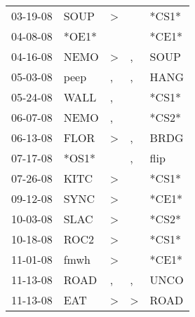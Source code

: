 \begin{supertabular}{p{0.07\textwidth}p{0.06\textwidth}p{0.02\textwidth}p{0.02\textwidth}p{0.06\textwidth}}
          03-19-08\textsuperscript{} &           SOUP\textsuperscript{} &     \textgreater &               &                            *CS1* \\
          04-08-08\textsuperscript{} &                            *OE1* &                  &               &                            *CE1* \\
          04-16-08\textsuperscript{} &           NEMO\textsuperscript{} &     \textgreater &             , &           SOUP\textsuperscript{} \\
          05-03-08\textsuperscript{} &           peep\textsuperscript{} &                , &             , &           HANG\textsuperscript{} \\
          05-24-08\textsuperscript{} &           WALL\textsuperscript{} &                , &               &                            *CS1* \\
          06-07-08\textsuperscript{} &           NEMO\textsuperscript{} &                , &               &                            *CS2* \\
          06-13-08\textsuperscript{} &           FLOR\textsuperscript{} &     \textgreater &             , &           BRDG\textsuperscript{} \\
          07-17-08\textsuperscript{} &                            *OS1* &                  &             , &           flip\textsuperscript{} \\
          07-26-08\textsuperscript{} &           KITC\textsuperscript{} &     \textgreater &               &                            *CS1* \\
          09-12-08\textsuperscript{} &           SYNC\textsuperscript{} &     \textgreater &               &                            *CE1* \\
          10-03-08\textsuperscript{} &           SLAC\textsuperscript{} &     \textgreater &               &                            *CS2* \\
          10-18-08\textsuperscript{} &           ROC2\textsuperscript{} &     \textgreater &               &                            *CS1* \\
          11-01-08\textsuperscript{} &           fmwh\textsuperscript{} &     \textgreater &               &                            *CE1* \\
          11-13-08\textsuperscript{} &           ROAD\textsuperscript{} &                , &             , &           UNCO\textsuperscript{} \\
          11-13-08\textsuperscript{} &            EAT\textsuperscript{} &     \textgreater &  \textgreater &           ROAD\textsuperscript{} \\

\end{supertabular}
